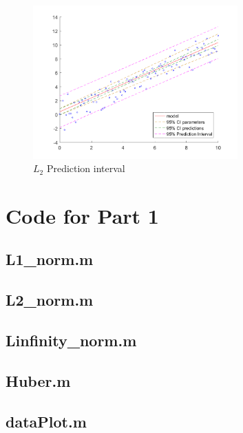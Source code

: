 \begin{figure}[htb]
\centering
\includegraphics[width=0.7\textwidth]{../img/L2_Predic}
\caption{$L_2$ Prediction interval}
\label{fig:L2PI}
\end{figure}

\newpage
\section{Code for Part 1} 
\label{code:part1}
\subsection{L1\_norm.m}


\newpage
\subsection{L2\_norm.m}


\newpage
\subsection{Linfinity\_norm.m}


\newpage
\subsection{Huber.m}


\subsection{dataPlot.m}



